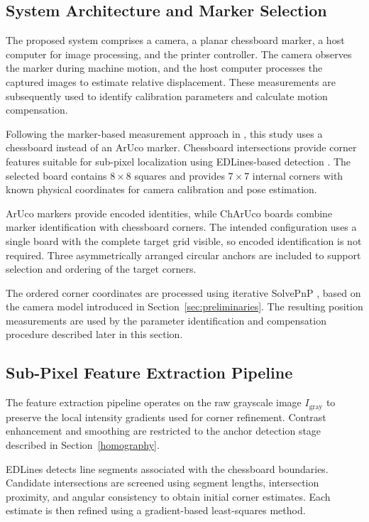 \documentclass[journal]{IEEEtran}
\begin{document}
\subsection{System Architecture and Marker Selection}
\label{rationale}

The proposed system comprises a camera, a planar
chessboard marker, a host computer for image processing,
and the printer controller. The camera observes the
marker during machine motion, and the host computer
processes the captured images to estimate relative
displacement. These measurements are subsequently
used to identify calibration parameters and calculate
motion compensation.

Following the marker-based measurement approach
in \cite{Owais2026}, this study uses a chessboard
instead of an ArUco marker. Chessboard intersections
provide corner features suitable for sub-pixel
localization using EDLines-based detection
\cite{Dan2022}. The selected board contains
$8\times8$ squares and provides $7\times7$ internal
corners with known physical coordinates for camera
calibration and pose estimation.

ArUco markers provide encoded identities, while
ChArUco boards combine marker identification with
chessboard corners. The intended configuration uses
a single board with the complete target grid visible,
so encoded identification is not required.
Three asymmetrically arranged circular anchors
are included to support selection and ordering
of the target corners.

The ordered corner coordinates are processed using
iterative SolvePnP \cite{opencv_solvepnp}, based on
the camera model introduced in
Section~\ref{sec:preliminaries}.
The resulting position measurements are used by
the parameter identification and compensation
procedure described later in this section.

\subsection{Sub-Pixel Feature Extraction Pipeline}

The feature extraction pipeline operates on the raw
grayscale image $I_{\text{gray}}$ to preserve the
local intensity gradients used for corner refinement.
Contrast enhancement and smoothing are restricted
to the anchor detection stage described in
Section~\ref{homography}.

EDLines detects line segments associated with the
chessboard boundaries. Candidate intersections are
screened using segment lengths, intersection proximity,
and angular consistency to obtain initial corner
estimates. Each estimate is then refined using
a gradient-based least-squares method.
\end{document}
